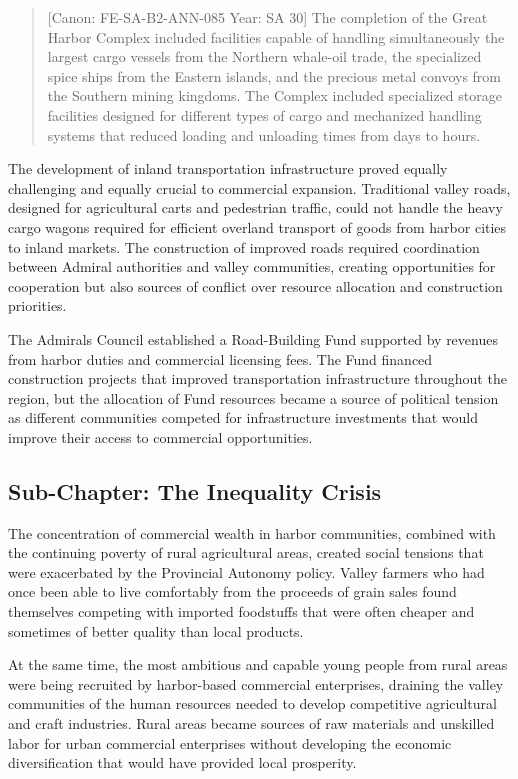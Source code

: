 \begin{quote}
{[}Canon: FE-SA-B2-ANN-085 \textbar{} Year: SA 30{]} The completion of
the Great Harbor Complex included facilities capable of handling
simultaneously the largest cargo vessels from the Northern whale-oil
trade, the specialized spice ships from the Eastern islands, and the
precious metal convoys from the Southern mining kingdoms. The Complex
included specialized storage facilities designed for different types of
cargo and mechanized handling systems that reduced loading and unloading
times from days to hours.
\end{quote}

The development of inland transportation infrastructure proved equally
challenging and equally crucial to commercial expansion. Traditional
valley roads, designed for agricultural carts and pedestrian traffic,
could not handle the heavy cargo wagons required for efficient overland
transport of goods from harbor cities to inland markets. The
construction of improved roads required coordination between Admiral
authorities and valley communities, creating opportunities for
cooperation but also sources of conflict over resource allocation and
construction priorities.

The Admiral\textquotesingle s Council established a Road-Building Fund
supported by revenues from harbor duties and commercial licensing fees.
The Fund financed construction projects that improved transportation
infrastructure throughout the region, but the allocation of Fund
resources became a source of political tension as different communities
competed for infrastructure investments that would improve their access
to commercial opportunities.

\subsection{Sub-Chapter: The Inequality
Crisis}\label{sub-chapter-the-inequality-crisis}

The concentration of commercial wealth in harbor communities, combined
with the continuing poverty of rural agricultural areas, created social
tensions that were exacerbated by the Provincial Autonomy policy. Valley
farmers who had once been able to live comfortably from the proceeds of
grain sales found themselves competing with imported foodstuffs that
were often cheaper and sometimes of better quality than local products.

At the same time, the most ambitious and capable young people from rural
areas were being recruited by harbor-based commercial enterprises,
draining the valley communities of the human resources needed to develop
competitive agricultural and craft industries. Rural areas became
sources of raw materials and unskilled labor for urban commercial
enterprises without developing the economic diversification that would
have provided local prosperity.


